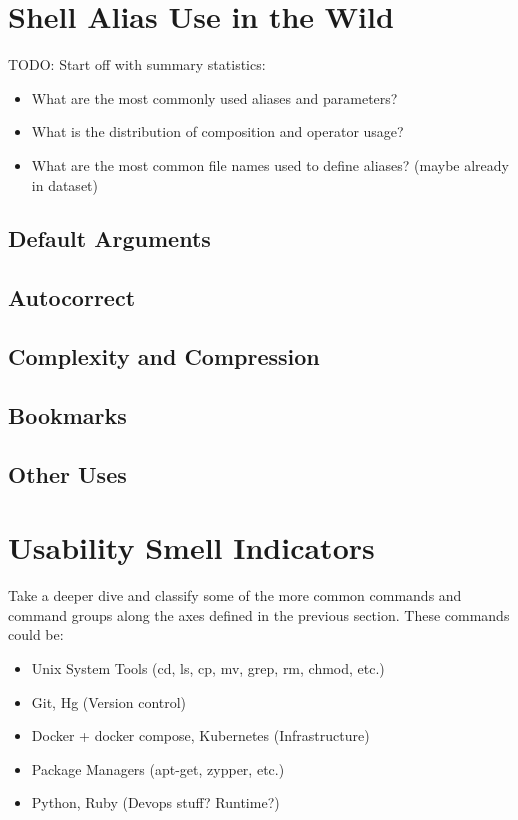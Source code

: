 \section{Shell Alias Use in the Wild}

TODO: Start off with summary statistics:
\begin{itemize}
	\item What are the most commonly used aliases and parameters?
	\item What is the distribution of composition and operator usage?
	\item What are the most common file names used to define aliases? (maybe already in dataset)
\end{itemize}

\subsection{Default Arguments}


\subsection{Autocorrect}


\subsection{Complexity and Compression}




\subsection{Bookmarks}

\subsection{Other Uses}


\section{Usability Smell Indicators}

Take a deeper dive and classify some of the more common commands and command groups along the axes defined in the previous section. These commands could be:
\begin{itemize}
	\item Unix System Tools (cd, ls, cp, mv, grep, rm, chmod, etc.)
	\item Git, Hg (Version control)
	\item Docker + docker compose, Kubernetes (Infrastructure)
	\item Package Managers (apt-get, zypper, etc.)
	\item Python, Ruby (Devops stuff? Runtime?)
\end{itemize}


